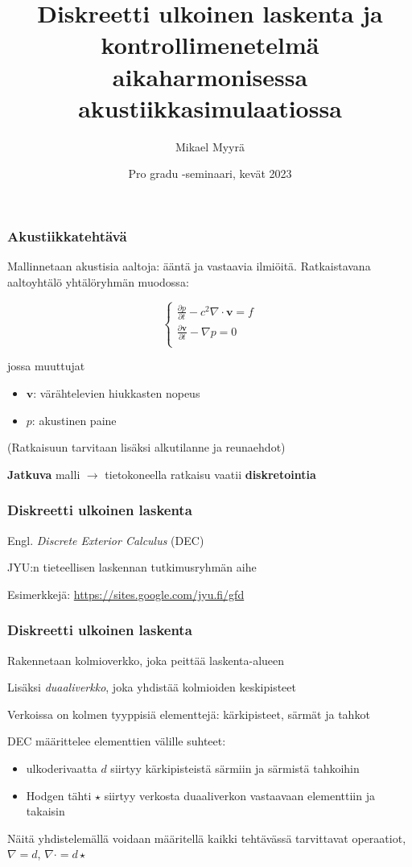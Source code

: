 \documentclass{beamer}
\title{Diskreetti ulkoinen laskenta ja kontrollimenetelmä aikaharmonisessa akustiikkasimulaatiossa}
\author{Mikael Myyrä}
\date{Pro gradu -seminaari, kevät 2023}
\begin{document}
\frame{\titlepage}

\begin{frame}
  \frametitle{Akustiikkatehtävä}

  Mallinnetaan akustisia aaltoja: ääntä ja vastaavia ilmiöitä.
  Ratkaistavana aaltoyhtälö yhtälöryhmän muodossa:

  \[
    \begin{cases}
      \frac{\partial p}{\partial t} - c^2\nabla \cdot \mathbf{v} = f \\
      \frac{\partial \mathbf{v}}{\partial t} - \nabla p = 0 \\
    \end{cases}
  \]

  \pause

  jossa muuttujat
  \begin{itemize}
    \item $\mathbf{v}$: värähtelevien hiukkasten nopeus
    \item $p$: akustinen paine
  \end{itemize}

  (Ratkaisuun tarvitaan lisäksi alkutilanne ja reunaehdot)

  \pause

  \textbf{Jatkuva} malli
  $\rightarrow$ tietokoneella ratkaisu vaatii \textbf{diskretointia}
\end{frame}

\begin{frame}
  \frametitle{Diskreetti ulkoinen laskenta}

  Engl. \textit{Discrete Exterior Calculus} (DEC)

  JYU:n tieteellisen laskennan tutkimusryhmän aihe

  Esimerkkejä: \url{https://sites.google.com/jyu.fi/gfd}
\end{frame}

\begin{frame}
  \frametitle{Diskreetti ulkoinen laskenta}

  Rakennetaan kolmioverkko, joka peittää laskenta-alueen

  \pause

  Lisäksi \textit{duaaliverkko}, joka yhdistää kolmioiden keskipisteet

  \pause

  Verkoissa on kolmen tyyppisiä elementtejä:
  kärkipisteet, särmät ja tahkot

  \pause

  DEC määrittelee elementtien välille suhteet:
  \begin{itemize}
    \item ulkoderivaatta $d$ siirtyy kärkipisteistä särmiin ja särmistä tahkoihin
    \item Hodgen tähti $\star$ siirtyy verkosta duaaliverkon vastaavaan elementtiin ja takaisin
  \end{itemize}

  Näitä yhdistelemällä voidaan määritellä kaikki tehtävässä tarvittavat operaatiot,
  $\nabla = d$, $\nabla \cdot = d \star$
\end{frame}
\end{document}
